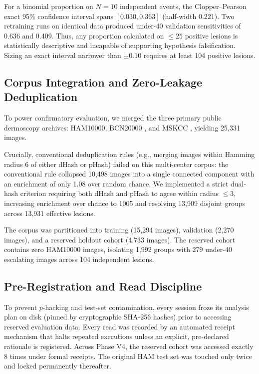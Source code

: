 \documentclass[journal]{IEEEtran}
\newcommand{\uforty}{under-40}
\begin{document}
For a binomial proportion on $N=10$ independent events, the Clopper--Pearson exact 95\% confidence interval spans $[0.030, 0.363]$ (half-width 0.221). Two retraining runs on identical data produced \uforty{} validation sensitivities of 0.636 and 0.409. Thus, any proportion calculated on $\le 25$ positive lesions is statistically descriptive and incapable of supporting hypothesis falsification. Sizing an exact interval narrower than $\pm 0.10$ requires at least 104 positive lesions.

\subsection{Corpus Integration and Zero-Leakage Deduplication}
To power confirmatory evaluation, we merged the three primary public dermoscopy archives: HAM10000, BCN20000 \cite{combalia2019bcn20000}, and MSKCC \cite{codella2018isic}, yielding 25,331 images. 

Crucially, conventional deduplication rules (e.g., merging images within Hamming radius 6 of either dHash or pHash) failed on this multi-center corpus: the conventional rule collapsed 10,498 images into a single connected component with an enrichment of only 1.08 over random chance. We implemented a strict dual-hash criterion requiring both dHash and pHash to agree within radius $\le 3$, increasing enrichment over chance to 1005 and resolving 13,909 disjoint groups across 13,931 effective lesions.

The corpus was partitioned into training (15,294 images), validation (2,270 images), and a reserved holdout cohort (4,733 images). The reserved cohort contains zero HAM10000 images, isolating 1,992 groups with 279 \uforty{} escalating images across 104 independent lesions.

\subsection{Pre-Registration and Read Discipline}
To prevent $p$-hacking and test-set contamination, every session froze its analysis plan on disk (pinned by cryptographic SHA-256 hashes) prior to accessing reserved evaluation data. Every read was recorded by an automated receipt mechanism that halts repeated executions unless an explicit, pre-declared rationale is registered. Across Phase V4, the reserved cohort was accessed exactly 8 times under formal receipts. The original HAM test set was touched only twice and locked permanently thereafter.
\end{document}
